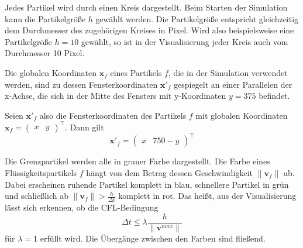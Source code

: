 \documentclass{scrreprt}
\begin{document}
Jedes Partikel wird durch einen Kreis dargestellt.
Beim Starten der Simulation kann die Partikelgröße $h$ gewählt werden.
Die Partikelgröße entspricht gleichzeitig dem Durchmesser des zugehörigen Kreises in Pixel.
Wird also beispielsweise eine Partikelgröße $h = 10$ gewählt, so ist in der Visualisierung jeder Kreis auch vom Durchmesser 10 Pixel.

Die globalen Koordinaten $\textbf{x}_f$ eines Partikels $f$,
die in der Simulation verwendet werden,
sind zu dessen Fensterkoordinaten $\textbf{x}'_f$ gespiegelt an einer Parallelen der x-Achse,
die sich in der Mitte des Fensters mit y-Koordinaten $y = 375$ befindet.

Seien $\textbf{x}'_f$ also die Fensterkoordinaten des Partikels $f$ mit globalen Koordinaten $\textbf{x}_f = \begin{pmatrix} x & y \end{pmatrix}^\intercal$.
Dann gilt
\begin{equation}
    \textbf{x}'_f = \begin{pmatrix}
        x & 750 - y
    \end{pmatrix}^\intercal
\end{equation}

Die Grenzpartikel werden alle in grauer Farbe dargestellt.
Die Farbe eines Flüssigkeitspartikels $f$ hängt von dem Betrag dessen Geschwindigkeit $\| \textbf{v}_f \|$ ab.
Dabei erscheinen ruhende Partikel komplett in blau, schnellere Partikel in grün und schließlich ab $\| \textbf{v}_f \| > \frac{h}{\Delta t}$ komplett in rot.
Das heißt, aus der Visualisierung lässt sich erkennen, ob die CFL-Bedingung \begin{equation}
    \Delta t \leq \lambda \frac{\hbar}{\|\textbf{v}^{max}\| }
\end{equation}
für $\lambda = 1$ erfüllt wird.
Die Übergänge zwischen den Farben sind fließend.
\end{document}
